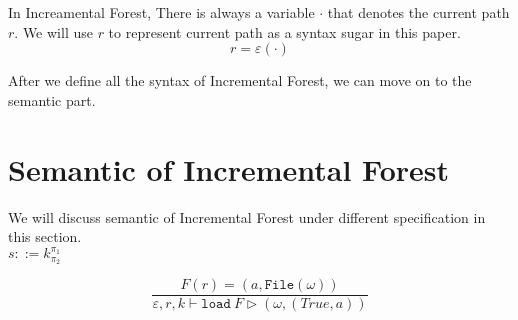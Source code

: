 \documentclass[10pt,twoside,a4paper]{article}
\theoremstyle{theorem}
\theoremstyle{lemma}
\theoremstyle{property}
\theoremstyle{definition}
\theoremstyle{assumption}
\begin{document}
In Increamental Forest, There is always a variable $\cdot$ that denotes the current path $r$. We will use $r$ to represent current path as a syntax sugar in this paper.
\begin{displaymath}
	r = \varepsilon(\cdot)
\end{displaymath}

\begin{comment}
For example, in Adaptive Forest, environment always contain a variable r which maps to the current path. We define environment before update $\varepsilon_{old}$, alias \emph{old} $\varepsilon$; environment after update $\varepsilon_{new}$, alias \emph{new} $\varepsilon$. Given any updates $\delta_\varepsilon$:
\begin{align*}
	\varepsilon_{old}(x) =& ~v\\
						  & ~where ~\delta_\varepsilon (x) = (v, \delta_v)\\
	\varepsilon_{new}(x) =& ~v'\\
						  & ~where ~\delta_\varepsilon (x) = (v, \delta_v)\\
						  & ~and ~v' = \delta_v v
\end{align*}

We also define equivalance of two environments $\varepsilon_1$ and $\varepsilon_2$
\begin{displaymath}
	\varepsilon_1 = \varepsilon_2
\end{displaymath}
\begin{displaymath}
	where \quad \mathtt{dom}(\varepsilon_1) = \mathtt{dom}(\varepsilon_2) ~\wedge~ \forall x \in \mathtt{dom}(\varepsilon_1), \quad \delta_\varepsilon(x) = (x, \emptyset)
\end{displaymath}
\end{comment}

After we define all the syntax of Incremental Forest, we can move on to the semantic part.

\newpage

\section{Semantic of Incremental Forest}

We will discuss semantic of Incremental Forest under different specification in this section.\\

$\boxed{s ::= k^{\pi_1}_{\pi_2}}$

\begin{displaymath}
	\frac{F(r) = (a, \mathtt{File}(\omega))}
	{\varepsilon, r, k \vdash \mathtt{load}~F \rhd (\omega, (True, a))}
\end{displaymath}
\end{document}
